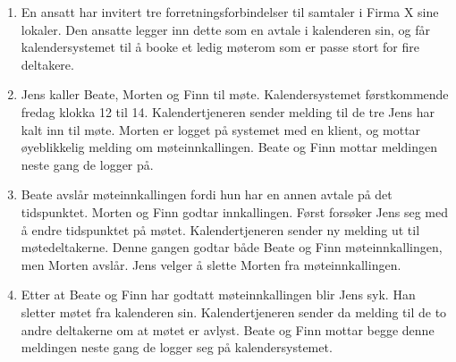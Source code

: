 \begin{enumerate}

\item
En ansatt har invitert tre forretningsforbindelser til samtaler i Firma X sine lokaler. Den ansatte legger inn dette som en avtale i kalenderen sin, og får kalendersystemet til å booke et ledig møterom som er passe stort for fire deltakere.

\item
Jens kaller Beate, Morten og Finn til møte. Kalendersystemet  førstkommende fredag klokka 12 til 14. Kalendertjeneren sender melding til de tre Jens har kalt inn til møte. Morten er logget på systemet med en klient, og mottar øyeblikkelig melding om møteinnkallingen. Beate og Finn mottar meldingen neste gang de logger på.

\item
Beate avslår møteinnkallingen fordi hun har en annen avtale på det tidspunktet. Morten og Finn godtar innkallingen. Først forsøker Jens seg med å endre tidspunktet på møtet. Kalendertjeneren sender ny melding ut til møtedeltakerne. Denne gangen godtar både Beate og Finn møteinnkallingen, men Morten avslår. Jens velger å slette Morten fra møteinnkallingen. 

\item
Etter at Beate og Finn har godtatt møteinnkallingen blir Jens syk. Han sletter møtet fra kalenderen sin. Kalendertjeneren sender da melding til de to andre deltakerne om at møtet er avlyst. Beate og Finn mottar begge denne meldingen neste gang de logger seg på kalendersystemet.

\end{enumerate}
\newpage